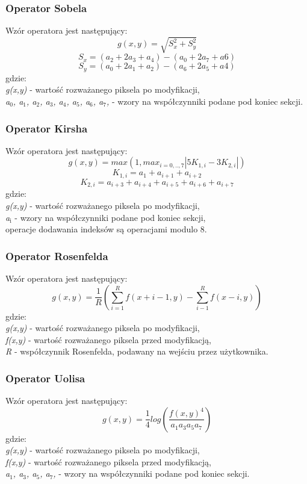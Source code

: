 \documentclass{classrep}
\begin{document}
\subsubsection{Operator Sobela}
Wzór operatora jest następujący:
\[ g(x,y) = \sqrt{S^2_x + S^2_y} \]
\[ S_x = (a_2 + 2a_3 + a_4) - (a_0 +2a_7 + a6) \]
\[ S_y = (a_0 + 2a_1 + a_2) - (a_6 +2a_5 + a4) \]
gdzie:\\
\textit{g(x,y)} - wartość rozważanego piksela po modyfikacji,\\
\textit{a$_{\text{0}}$, a$_{\text{1}}$, a$_{\text{2}}$, a$_{\text{3}}$, a$_{\text{4}}$, a$_{\text{5}}$, a$_{\text{6}}$, a$_{\text{7}}$,} - wzory na współczynniki podane pod koniec sekcji.

\subsubsection{Operator Kirsha}
Wzór operatora jest następujący:
\[ g(x,y) = max(1, max_{i=0,..,7}|5K_{1,i} - 3K_{2,i}|)\]
\[ K_{1,i} = a_1 + a_{i+1} + a_{i+2}\]
\[ K_{2,i} = a_{i+3} + a_{i+4} + a_{i+5} + a_{i+6} + a_{i+7}\]
gdzie:\\
\textit{g(x,y)} - wartość rozważanego piksela po modyfikacji,\\
\textit{a$_{\text{i}}$} - wzory na współczynniki podane pod koniec sekcji,\\
operacje dodawania indeksów są operacjami modulo 8.

\subsubsection{Operator Rosenfelda}
Wzór operatora jest następujący:
\[ g(x,y) = \frac{1}{R}(\sum^R_{i=1} f(x + i - 1, y) - \sum^R_{i-1} f(x - i, y))  \]
gdzie:\\
\textit{g(x,y)} - wartość rozważanego piksela po modyfikacji,\\
\textit{f(x,y)} - wartość rozważanego piksela przed modyfikacją,\\
\textit{R} - współczynnik Rosenfelda, podawany na wejściu przez użytkownika.

\subsubsection{Operator Uolisa}
Wzór operatora jest następujący:
\[ g(x,y) = \frac{1}{4} log(\frac{f(x,y)^4}{a_1a_3a_5a_7})  \]
gdzie:\\
\textit{g(x,y)} - wartość rozważanego piksela po modyfikacji,\\
\textit{f(x,y)} - wartość rozważanego piksela przed modyfikacją,\\
\textit{a$_{\text{1}}$, a$_{\text{3}}$, a$_{\text{5}}$, a$_{\text{7}}$,} - wzory na współczynniki podane pod koniec sekcji.\\
\end{document}
